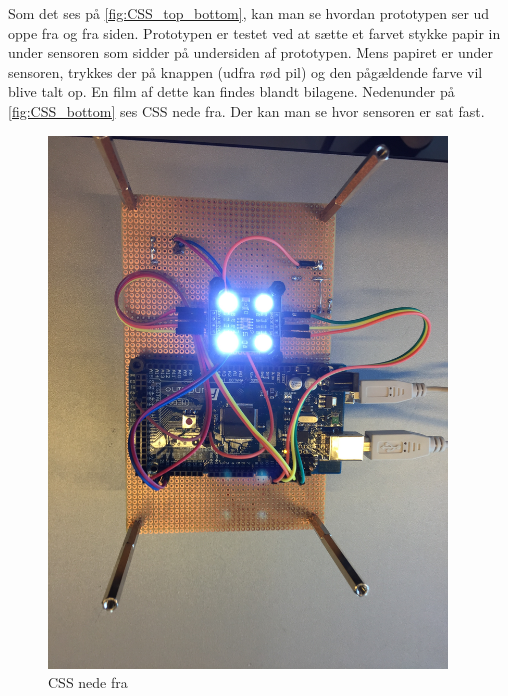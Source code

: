 Som det ses på \autoref{fig:CSS_top_bottom}, kan man se hvordan prototypen ser ud oppe fra og fra siden. Prototypen er testet ved at sætte et farvet stykke papir in under sensoren som sidder på undersiden af prototypen. Mens papiret er under sensoren, trykkes der på knappen (udfra rød pil) og den pågældende farve vil blive talt op. En film af dette kan findes blandt bilagene. Nedenunder på \autoref{fig:CSS_bottom} ses CSS nede fra. Der kan man se hvor sensoren er sat fast.


\begin{figure}[H]
	\centering
	\includegraphics[width = 300pt]{Img/CSS_bottom.jpg}
	\caption{CSS nede fra}
	\label{fig:CSS_bottom}
\end{figure}

